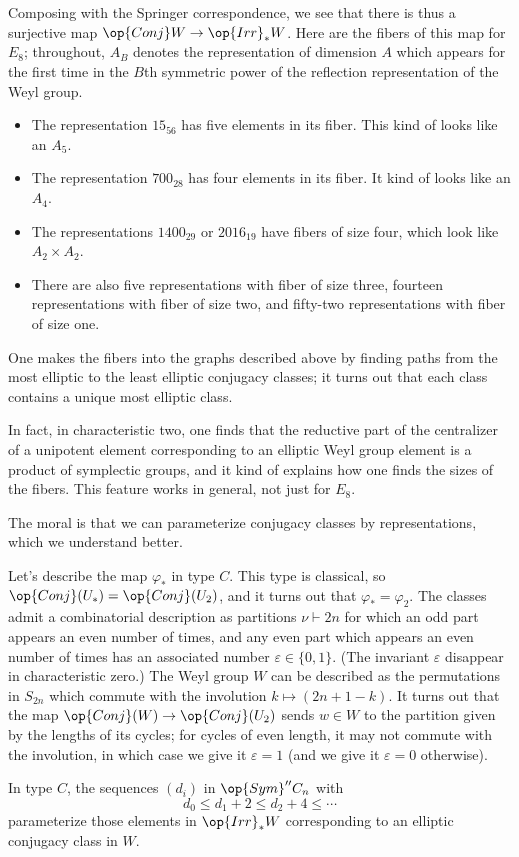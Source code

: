 \documentclass[../notes.tex]{subfiles}
\begin{document}
\begin{example}
	Composing with the Springer correspondence, we see that there is thus a surjective map $\op{Conj}W\to\op{Irr}_*W$. Here are the fibers of this map for $E_8$; throughout, $A_B$ denotes the representation of dimension $A$ which appears for the first time in the $B$th symmetric power of the reflection representation of the Weyl group.
	\begin{itemize}
		\item The representation $15_{56}$ has five elements in its fiber. This kind of looks like an $A_5$.
		\item The representation $700_{28}$ has four elements in its fiber. It kind of looks like an $A_4$.
		\item The representations $1400_{29}$ or $2016_{19}$ have fibers of size four, which look like $A_2\times A_2$.
		\item There are also five representations with fiber of size three, fourteen representations with fiber of size two, and fifty-two representations with fiber of size one.
	\end{itemize}
	One makes the fibers into the graphs described above by finding paths from the most elliptic to the least elliptic conjugacy classes; it turns out that each class contains a unique most elliptic class.
\end{example}
\begin{remark}
	In fact, in characteristic two, one finds that the reductive part of the centralizer of a unipotent element corresponding to an elliptic Weyl group element is a product of symplectic groups, and it kind of explains how one finds the sizes of the fibers. This feature works in general, not just for $E_8$.
\end{remark}
The moral is that we can parameterize conjugacy classes by representations, which we understand better.
\begin{example}
	Let's describe the map $\varphi_*$ in type $C$. This type is classical, so $\op{Conj}(U_*)=\op{Conj}(U_2)$, and it turns out that $\varphi_*=\varphi_2$. The classes admit a combinatorial description as partitions $\nu\vdash2n$ for which an odd part appears an even number of times, and any even part which appears an even number of times has an associated number $\varepsilon\in\{0,1\}$. (The invariant $\varepsilon$ disappear in characteristic zero.) The Weyl group $W$ can be described as the permutations in $S_{2n}$ which commute with the involution $k\mapsto(2n+1-k)$. It turns out that the map $\op{Conj}(W)\to\op{Conj}(U_2)$ sends $w\in W$ to the partition given by the lengths of its cycles; for cycles of even length, it may not commute with the involution, in which case we give it $\varepsilon=1$ (and we give it $\varepsilon=0$ otherwise). 
\end{example}
\begin{example}
	In type $C$, the sequences $(d_i)$ in $\op{Sym}''C_n$ with
	\[d_0\le d_1+2\le d_2+4\le\cdots\]
	parameterize those elements in $\op{Irr}_*W$ corresponding to an elliptic conjugacy class in $W$.
\end{example}
\end{document}
